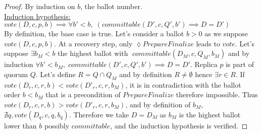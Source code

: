 \documentclass[a4paper]{article}
\theoremstyle{definition}
\theoremstyle{plain}
\begin{document}
\begin{proof}
By induction on $b$, the ballot number. \\
    \underline{Induction hypothesis:}\\
$vote(D,c,p,b) \implies \forall b'<b, \; (committable(D',c,Q',b') \implies D=D')
$\\

By definition, the base case is true. Let's consider a ballot $b>0$ as we suppose $vote(D,c,p,b)$.  At a recovery step, only $\lozenge PrepareFinalize$ leads to $vote$. Let's suppose $\exists b_M<b$ the highest ballot with $\; committable(D_M,c,Q_M,b_M)$ and by induction $\forall b'<b_M, \; committable(D',c,Q',b') \implies D=D'$. Replica $p$ is part of quorum $Q$. Let's define $R=Q \cap Q_M$ and by definition $R \neq \emptyset$ hence $\exists r \in R$. If $vote(D_r,c,r,b) < vote(D'_r,c,r,b_M)$, it is in contradiction with the ballot order $b < b_M$ that is a precondition of $PrepareFinalize$ therefore impossible. Thus $vote(D_r,c,r,b) > vote(D'_r,c,r,b_M)$, and by definition of $b_M$, $\nexists q, vote(D_q,c,q, b_q)$. Therefore we take $D=D_M$ as $b_M$ is the highest ballot lower than $b$ possibly $committable$, and the induction hypothesis is verified.
\end{proof}
\end{document}
